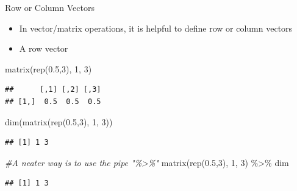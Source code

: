 \documentclass[
  ignorenonframetext,
]{beamer}
\newenvironment{Shaded}{\begin{snugshade}}{\end{snugshade}}
\newcommand{\CommentTok}[1]{\textcolor[rgb]{0.56,0.35,0.01}{\textit{#1}}}
\newcommand{\DecValTok}[1]{\textcolor[rgb]{0.00,0.00,0.81}{#1}}
\newcommand{\FloatTok}[1]{\textcolor[rgb]{0.00,0.00,0.81}{#1}}
\newcommand{\FunctionTok}[1]{\textcolor[rgb]{0.00,0.00,0.00}{#1}}
\newcommand{\NormalTok}[1]{#1}
\newcommand{\SpecialCharTok}[1]{\textcolor[rgb]{0.00,0.00,0.00}{#1}}
\providecommand{\tightlist}{%
  \setlength{\itemsep}{0pt}\setlength{\parskip}{0pt}}
\begin{document}
\begin{frame}[fragile]{Row or Column Vectors}
\protect\hypertarget{row-or-column-vectors-1}{}
\begin{itemize}
\tightlist
\item
  In vector/matrix operations, it is helpful to define row or column
  vectors
\item
  A row vector
\end{itemize}

\begin{Shaded}
\begin{Highlighting}[]
\FunctionTok{matrix}\NormalTok{(}\FunctionTok{rep}\NormalTok{(}\FloatTok{0.5}\NormalTok{,}\DecValTok{3}\NormalTok{), }\DecValTok{1}\NormalTok{, }\DecValTok{3}\NormalTok{)}
\end{Highlighting}
\end{Shaded}

\begin{verbatim}
##      [,1] [,2] [,3]
## [1,]  0.5  0.5  0.5
\end{verbatim}

\begin{Shaded}
\begin{Highlighting}[]
\FunctionTok{dim}\NormalTok{(}\FunctionTok{matrix}\NormalTok{(}\FunctionTok{rep}\NormalTok{(}\FloatTok{0.5}\NormalTok{,}\DecValTok{3}\NormalTok{), }\DecValTok{1}\NormalTok{, }\DecValTok{3}\NormalTok{))}
\end{Highlighting}
\end{Shaded}

\begin{verbatim}
## [1] 1 3
\end{verbatim}

\begin{Shaded}
\begin{Highlighting}[]
\CommentTok{\#A neater way is to use the pipe "\%\textgreater{}\%"}
\FunctionTok{matrix}\NormalTok{(}\FunctionTok{rep}\NormalTok{(}\FloatTok{0.5}\NormalTok{,}\DecValTok{3}\NormalTok{), }\DecValTok{1}\NormalTok{, }\DecValTok{3}\NormalTok{) }\SpecialCharTok{\%\textgreater{}\%}\NormalTok{ dim}
\end{Highlighting}
\end{Shaded}

\begin{verbatim}
## [1] 1 3
\end{verbatim}
\end{frame}
\end{document}
